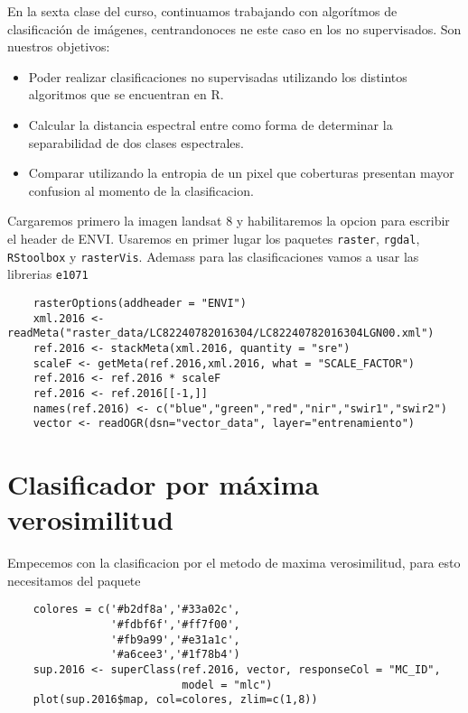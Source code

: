 En la sexta clase del curso, continuamos trabajando con algor\'itmos de clasificaci\'on de im\'agenes, centrandonoces ne este caso en los no supervisados. Son nuestros objetivos:

\begin{itemize}
  \item Poder realizar clasificaciones no supervisadas utilizando los distintos algoritmos que se encuentran en R.
  \item Calcular la distancia espectral entre como forma de determinar la separabilidad de dos clases espectrales.
  \item Comparar utilizando la entropia de un pixel que coberturas presentan  mayor confusion al momento de la clasificacion.
\end{itemize}

Cargaremos primero la imagen landsat 8 y habilitaremos la opcion para escribir el header de ENVI\@. Usaremos en primer lugar los paquetes \texttt{raster}, \texttt{rgdal}, \texttt{RStoolbox} y \texttt{rasterVis}. Ademass para las clasificaciones vamos a usar las librerias \texttt{e1071}

\begin{lstlisting}
    rasterOptions(addheader = "ENVI")
    xml.2016 <- readMeta("raster_data/LC82240782016304/LC82240782016304LGN00.xml")
    ref.2016 <- stackMeta(xml.2016, quantity = "sre")
    scaleF <- getMeta(ref.2016,xml.2016, what = "SCALE_FACTOR")
    ref.2016 <- ref.2016 * scaleF
    ref.2016 <- ref.2016[[-1,]]
    names(ref.2016) <- c("blue","green","red","nir","swir1","swir2")
    vector <- readOGR(dsn="vector_data", layer="entrenamiento")
\end{lstlisting}

\section{Clasificador por m\'axima verosimilitud}

Empecemos con la clasificacion por el metodo de maxima verosimilitud, para esto necesitamos del paquete

\begin{lstlisting}
    colores = c('#b2df8a','#33a02c',
                '#fdbf6f','#ff7f00',
                '#fb9a99','#e31a1c',
                '#a6cee3','#1f78b4')
    sup.2016 <- superClass(ref.2016, vector, responseCol = "MC_ID",
                           model = "mlc")
    plot(sup.2016$map, col=colores, zlim=c(1,8))
\end{lstlisting}

